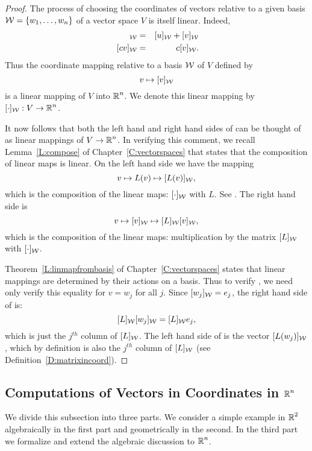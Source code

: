 \documentclass{ximera}
\begin{document}
\begin{proof} The process of choosing the coordinates of vectors relative to
a given basis ${\cal W} =\{w_1,\ldots,w_n\}$ of a vector space $V$
is itself linear.  Indeed,
\begin{eqnarray*}
[u+v]_{\cal W} & = & [u]_{\cal W} + [v]_{\cal W} \\
  \; [cv]_{\cal W}  & = &  c[v]_{\cal W}.
\end{eqnarray*}
Thus the coordinate mapping relative to a basis ${\cal W}$ of $V$
defined by
\begin{equation}  \label{e:coordmap}
v \mapsto [v]_{\cal W}
\end{equation}
is a linear mapping of $V$ into $\mbox{$\Bbb{R}$}^n$.  We denote this linear
mapping by $[\cdot]_{\cal W}:V\to\mbox{$\Bbb{R}$}^n$.


It now follows that both the left hand and right hand sides of
 can be thought of as linear mappings of $V\to\mbox{$\Bbb{R}$}^n$.
In verifying this comment, we recall Lemma~\ref{L:compose} of
Chapter~\ref{C:vectorspaces} that states that the composition of linear
maps is linear.  On the left hand side we have the mapping
\[
v \mapsto L(v) \mapsto [L(v)]_{\cal W},
\]
which is the composition of the linear maps: $[\cdot]_{\cal W}$ with
$L$.  See .  The right hand side is
\[
v \mapsto [v]_{\cal W} \mapsto [L]_{\cal W} [v]_{\cal W},
\]
which is the composition of the linear maps:  multiplication by the
matrix $[L]_{\cal W}$ with $[\cdot]_{\cal W}$.

Theorem~\ref{L:linmapfrombasis} of Chapter~\ref{C:vectorspaces}
states that linear mappings are determined by their actions on a
basis.  Thus to verify , we need only verify this
equality for $v=w_j$ for all $j$.  Since $[w_j]_{\cal W}=e_j$, the right
hand side of  is:
\[
[L]_{\cal W} [w_j]_{\cal W} =  [L]_{\cal W} e_j,
\]
which is just the $j^{th}$ column of $[L]_{\cal W}$.  The left hand side of
 is the vector $[L(w_j)]_{\cal W}$, which by definition is
also the $j^{th}$ column of $[L]_{\cal W}$
(see Definition~\ref{D:matrixincoord}).    \end{proof}


\subsection*{Computations of Vectors in Coordinates in $\mbox{$\Bbb{R}$}^n$}

We divide this subsection into three parts.  We consider a simple example in
$\mbox{$\Bbb{R}$}^2$ algebraically in the first part and geometrically in the second.  In
the third part we formalize and extend the algebraic discussion to $\mbox{$\Bbb{R}$}^n$.
\end{document}
